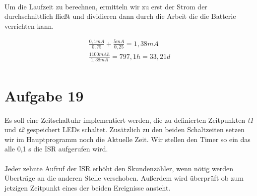 \paragraph*{}
Um die Laufzeit zu berechnen, ermitteln wir zu erst der Strom der durchschnittlich fließt und dividieren dann durch die Arbeit die die Batterie verrichten kann. 

\begin{eqnarray*}
	\frac{0,1 mA}{0,75} + \frac{5mA}{0,25} = 1,38 mA \\
	\frac{1100 mAh}{1,38 mA} = 797,1 h = 33,21 d \\
\end{eqnarray*}

\section*{Aufgabe 19}

\paragraph*{}
Es soll eine Zeitschaltuhr implementiert werden, die zu definierten Zeitpunkten {\em t1} und {\em t2} gespeichert LEDs schaltet. Zusätzlich zu den beiden Schaltzeiten setzen wir im Hauptprogramm noch die Aktuelle Zeit. Wir stellen den Timer so ein das alle 0,1 s die ISR aufgerufen wird.



\paragraph*{}
Jeder zehnte Aufruf der ISR erhöht den Skundenzähler, wenn nötig werden Überträge an die anderen Stelle verschoben. Außerdem wird überprüft ob zum jetzigen Zeitpunkt eines der beiden Ereignisse ansteht.


